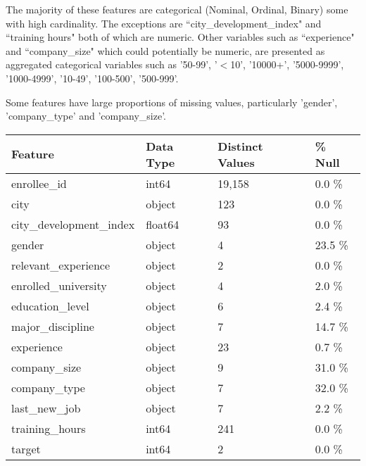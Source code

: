 \documentclass[11pt]{article}
\begin{document}
The majority of these features are categorical (Nominal, Ordinal, Binary) some with high cardinality. The exceptions are ``city\_development\_index" and ``training hours" both of which are numeric. Other variables such as ``experience" and ``company\_size" which could potentially be numeric, are presented as aggregated categorical variables such as '50-99', '$<$10', '10000+', '5000-9999', '1000-4999', '10-49', '100-500', '500-999'. 

Some features have large proportions of missing values, particularly 'gender', 'company\_type' and 'company\_size'.



\begin{table}[h]
\centering
\begin{tabular}{ |p{4cm}||p{2cm}| p{2.53cm}| p{1.5cm}|}
 \hline
 Feature 		& Data Type	& Distinct Values	& \% Null\\
 \hline
enrollee\_id 	& int64 & 19,158 & 0.0 \%	\\
city			 & object & 123 & 0.0 \% \\
city\_development\_index & float64 & 93 & 0.0 \% \\
gender		& object & 4 & 23.5 \% \\
relevant\_experience & object & 2 & 0.0 \%\\

enrolled\_university & object & 4 & 2.0 \% \\

education\_level & object & 6 & 2.4 \% \\

major\_discipline  & object & 7 & 14.7 \% \\

experience  	& object & 23 & 0.7 \% \\

company\_size 	& object & 9 & 31.0 \% \\

company\_type 	& object & 7 & 32.0 \%\\

last\_new\_job 	& object & 7 & 2.2 \%\\

training\_hours & int64 & 241 & 0.0 \%  \\

target 		 & int64 & 2 & 0.0 \% \\
 \hline
\end{tabular}
\end{table}
\end{document}
